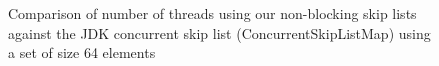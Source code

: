 \begin{figure}
\begin{center}
	\end{center}
	\caption{Comparison of number of threads using our non-blocking skip lists against the JDK concurrent skip list (ConcurrentSkipListMap) using a set of size 64 elements}
\end{figure}


